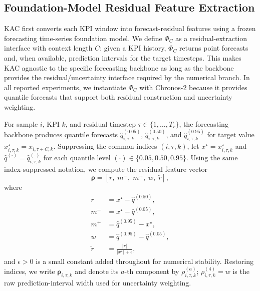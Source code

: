 \documentclass[conference]{IEEEtran}
\begin{document}
\subsection{Foundation-Model Residual Feature Extraction}
\label{sec:chronos}

KAC first converts each KPI window into forecast-residual features
using a frozen forecasting time-series foundation model. We define
$\Phi_C$ as a residual-extraction interface with context length $C$:
given a KPI history, $\Phi_C$ returns point forecasts and, when
available, prediction intervals for the target timesteps. This makes
KAC agnostic to the specific forecasting backbone as long as the
backbone provides the residual/uncertainty interface required by the
numerical branch. In all reported experiments, we instantiate
$\Phi_C$ with Chronos-2 because it provides quantile forecasts that
support both residual construction and uncertainty weighting.

For sample $i$, KPI $k$, and residual timestep $\tau \in \{1,\ldots,T_r\}$,
the forecasting backbone produces quantile forecasts
$\hat{q}^{(0.05)}_{i,\tau,k}$,
$\hat{q}^{(0.50)}_{i,\tau,k}$, and
$\hat{q}^{(0.95)}_{i,\tau,k}$
for target value $x^{\star}_{i,\tau,k}=x_{i,\tau+C,k}$.
Suppressing the common indices $(i,\tau,k)$, let
$x^\star=x^\star_{i,\tau,k}$ and
$\hat{q}^{(\cdot)}=\hat{q}^{(\cdot)}_{i,\tau,k}$ for each quantile level $(\cdot)\in\{0.05,0.50,0.95\}$.
Using the same index-suppressed notation, we compute the residual feature vector
\begin{equation}
\boldsymbol{\rho}
=
[r,\; m^{-},\; m^{+},\; w,\; \tilde{r}],
\end{equation}
where
\begin{equation}
\begin{aligned}
r &= x^\star-\hat{q}^{(0.50)},\\
m^{-} &= x^\star-\hat{q}^{(0.05)},\\
m^{+} &= \hat{q}^{(0.95)}-x^\star,\\
w &= \hat{q}^{(0.95)}-\hat{q}^{(0.05)},\\
\tilde{r} &= \frac{|r|}{|x^\star|+\epsilon},
\end{aligned}
\end{equation}
and $\epsilon>0$ is a small constant added throughout for numerical stability. Restoring indices, we write $\boldsymbol{\rho}_{i,\tau,k}$ and denote its $a$-th component by $\rho^{(a)}_{i,\tau,k}$; $\rho^{(4)}_{i,\tau,k}=w$ is the raw prediction-interval width used for uncertainty weighting.
\end{document}
